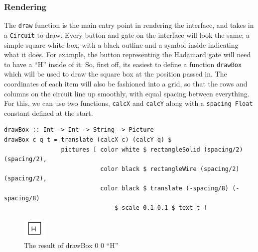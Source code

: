 \documentclass[a4paper,10pt, titlepage, twoside]{article}
\begin{document}
\subsubsection{Rendering}
The \texttt{draw} function is the main entry point in rendering the interface, and takes in a \texttt{Circuit} to draw. Every button and gate on the interface will look the same; a simple square white box, with a black outline and a symbol inside indicating what it does. For example, the button representing the Hadamard gate will need to have a ``H'' inside of it. So, first off, its easiest to define a function \texttt{drawBox} which will be used to draw the square box at the position passed in. The coordinates of each item will also be fashioned into a grid, so that the rows and columns on the circuit line up smoothly, with equal spacing between everything. For this, we can use two functions, \texttt{calcX} and \texttt{calcY} along with a \texttt{spacing Float} constant defined at the start.
\begin{verbatim}
drawBox :: Int -> Int -> String -> Picture
drawBox c q t = translate (calcX c) (calcY q) $
                pictures [ color white $ rectangleSolid (spacing/2) (spacing/2),
                           color black $ rectangleWire (spacing/2) (spacing/2),
                           color black $ translate (-spacing/8) (-spacing/8) 
                               $ scale 0.1 0.1 $ text t ]
\end{verbatim}

\begin{figure}
    \centering
    \includegraphics[width=0.1\textwidth]{drawbox1}
    \caption{The result of drawBox 0 0 ``H''}
\end{figure}
\end{document}
